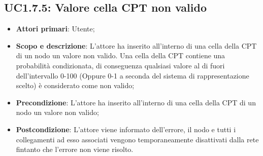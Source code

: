 \subsection{UC1.7.5: Valore cella CPT non valido} 
\hypertarget{UC1.7.5}{} 
\begin{itemize} 
	\item{\textbf{Attori primari}: Utente;} 
	\item{\textbf{Scopo e descrizione}: L'attore ha inserito all'interno di una cella della CPT di un nodo un valore non valido. Una cella della CPT contiene una probabilità condizionata, di conseguenza qualsiasi valore al di fuori dell'intervallo 0-100 (Oppure 0-1 a seconda del sistema di rappresentazione scelto) è considerato come non valido;} 
	\item{\textbf{Precondizione}: L'attore ha inserito all'interno di una cella della CPT di un nodo un valore non valido;} 
	\item{\textbf{Postcondizione}: L'attore viene informato dell'errore, il nodo e tutti i collegamenti ad esso associati vengono temporaneamente disattivati dalla rete fintanto che l'errore non viene risolto.} 
\end{itemize} 
